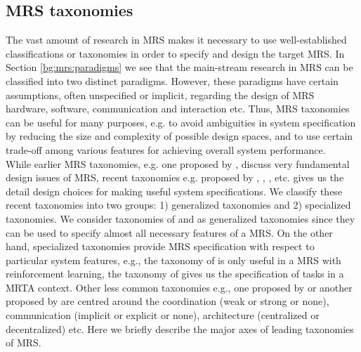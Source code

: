 \subsection{MRS taxonomies}
\label{bg:mrs:taxonomies}
The vast amount of research in MRS makes it necessary to use well-established classifications or taxonomies in order to specify and design the target MRS. In Section \ref{bg:mrs:paradigms} we see that the main-stream research in MRS can be classified into two distinct paradigms. However, these paradigms have certain assumptions, often unspecified or implicit, regarding the design of MRS hardware, software, communication and interaction etc. Thus, MRS taxonomies can be useful for many purposes, e.g. to avoid ambiguities in system specification by reducing the size and complexity of possible design spaces, and to use certain trade-off among various features for achieving overall system performance.\\
While earlier MRS taxonomies, e.g. one proposed by ,  discuss very fundamental design issues of MRS, recent taxonomies e.g. proposed by , , ,  etc. gives us the detail design choices for making useful system specifications. We classify these recent taxonomies into two groups: 1) generalized taxonomies and 2) specialized taxonomies. We consider taxonomies of  and  as generalized taxonomies since they  can be used to specify almost all necessary features of a MRS.   On the other hand, specialized taxonomies provide MRS specification with respect to particular system features, e.g., the taxonomy of  is only useful in a MRS with reinforcement learning, the taxonomy of  gives us the specification of tasks in a MRTA context. Other less common taxonomies e.g., one proposed by  or another proposed by  are centred around the coordination (weak or strong or none), communication (implicit or explicit or none), architecture (centralized or decentralized) etc. Here we briefly describe the major axes of leading taxonomies of MRS.
